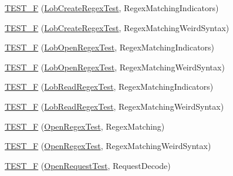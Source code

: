 \begin{DoxyCompactItemize}
\item 
\hyperlink{namespaceclang_1_1tidy_1_1pagesjaunes_1_1test_a323364914c7bbb949edba7c8e6080598}{T\+E\+S\+T\+\_\+F} (\hyperlink{classclang_1_1tidy_1_1pagesjaunes_1_1test_1_1_lob_create_regex_test}{Lob\+Create\+Regex\+Test}, Regex\+Matching\+Indicators)
\item 
\hyperlink{namespaceclang_1_1tidy_1_1pagesjaunes_1_1test_aa0c1e4b3b995955cbb442e3301eaff74}{T\+E\+S\+T\+\_\+F} (\hyperlink{classclang_1_1tidy_1_1pagesjaunes_1_1test_1_1_lob_create_regex_test}{Lob\+Create\+Regex\+Test}, Regex\+Matching\+Weird\+Syntax)
\item 
\hyperlink{namespaceclang_1_1tidy_1_1pagesjaunes_1_1test_aecfb17d2b0da07b94bbe5fcc9eaeccc1}{T\+E\+S\+T\+\_\+F} (\hyperlink{classclang_1_1tidy_1_1pagesjaunes_1_1test_1_1_lob_open_regex_test}{Lob\+Open\+Regex\+Test}, Regex\+Matching\+Indicators)
\item 
\hyperlink{namespaceclang_1_1tidy_1_1pagesjaunes_1_1test_a48fef03720771a873ebb79ccee257d07}{T\+E\+S\+T\+\_\+F} (\hyperlink{classclang_1_1tidy_1_1pagesjaunes_1_1test_1_1_lob_open_regex_test}{Lob\+Open\+Regex\+Test}, Regex\+Matching\+Weird\+Syntax)
\item 
\hyperlink{namespaceclang_1_1tidy_1_1pagesjaunes_1_1test_a8901d799343ceabfae305d4a75e028ef}{T\+E\+S\+T\+\_\+F} (\hyperlink{classclang_1_1tidy_1_1pagesjaunes_1_1test_1_1_lob_read_regex_test}{Lob\+Read\+Regex\+Test}, Regex\+Matching\+Indicators)
\item 
\hyperlink{namespaceclang_1_1tidy_1_1pagesjaunes_1_1test_add145896a766ab2e9a31ae812408d30c}{T\+E\+S\+T\+\_\+F} (\hyperlink{classclang_1_1tidy_1_1pagesjaunes_1_1test_1_1_lob_read_regex_test}{Lob\+Read\+Regex\+Test}, Regex\+Matching\+Weird\+Syntax)
\item 
\hyperlink{namespaceclang_1_1tidy_1_1pagesjaunes_1_1test_a6a10a0e5bc2065fff16057f836ffcb48}{T\+E\+S\+T\+\_\+F} (\hyperlink{classclang_1_1tidy_1_1pagesjaunes_1_1test_1_1_open_regex_test}{Open\+Regex\+Test}, Regex\+Matching)
\item 
\hyperlink{namespaceclang_1_1tidy_1_1pagesjaunes_1_1test_a00feadd7e37766026650d2717318278f}{T\+E\+S\+T\+\_\+F} (\hyperlink{classclang_1_1tidy_1_1pagesjaunes_1_1test_1_1_open_regex_test}{Open\+Regex\+Test}, Regex\+Matching\+Weird\+Syntax)
\item 
\hyperlink{namespaceclang_1_1tidy_1_1pagesjaunes_1_1test_a7afb641ccb9e19a037895b9246bfeeb5}{T\+E\+S\+T\+\_\+F} (\hyperlink{classclang_1_1tidy_1_1pagesjaunes_1_1test_1_1_open_request_test}{Open\+Request\+Test}, Request\+Decode)
\item 

\end{DoxyCompactItemize}
